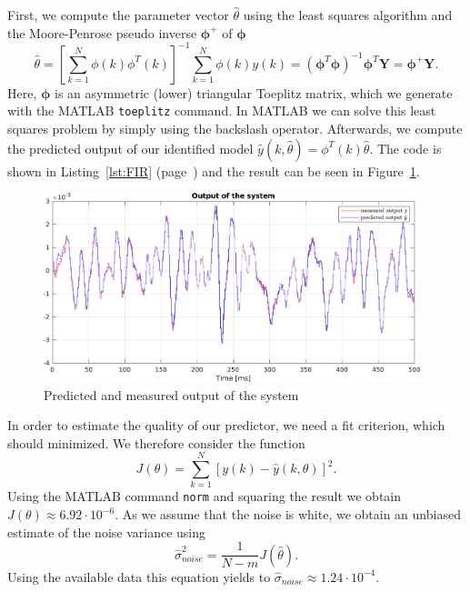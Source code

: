 First, we compute the parameter vector $\hat{\theta}$ using the least squares algorithm and the Moore-Penrose pseudo inverse $\pmb{\phi}^+$ of $\pmb{\phi}$
\begin{equation}\label{eq:FIRmodel}
	\hat{\theta} = \left[ \sum\limits_{k=1}^N \phi(k)\phi^T(k) \right]^{-1} \sum\limits_{k=1}^N 
\phi(k) y(k) = \left( \pmb{\phi}^T \pmb{\phi} \right)^{-1} \pmb{\phi}^T \textbf{Y} = \pmb{\phi}^+ \textbf{Y}.
\end{equation}
Here, $\pmb{\phi}$ is an asymmetric (lower) triangular Toeplitz matrix, which we generate with the MATLAB \texttt{toeplitz} command.
In MATLAB we can solve this least squares problem by simply using the backslash operator. 
Afterwards, we compute the predicted output of our identified model $\hat{y} (k,\hat{\theta}) = \phi^{T} (k) \hat{\theta}$. 
The code is shown in Listing~\ref{lst:FIR} (page~\pageref{lst:FIR}) and the result can be seen in Figure~\ref{fig:output_fir}.
\begin{figure}[h]
	\centering
	\includegraphics[height=5.5cm]{figures/output.pdf}
	\caption{Predicted and measured output of the system}\label{fig:output_fir}
\end{figure}
In order to estimate the quality of our predictor, we need a fit criterion, which should minimized. We therefore consider the function
\begin{equation}\label{eq:J}
	J(\theta) = \sum\limits_{k=1}^N \left[y(k) - \hat{y}(k,\theta) \right]^2.
\end{equation}
Using the MATLAB command \texttt{norm} and squaring the result we obtain $ J(\theta) \approx 6.92 \cdot 10^{-6}$. 
As we assume that the noise is white, we obtain an unbiased estimate of the noise variance using
\begin{equation}\label{eq:sigma}
	\hat{\sigma}_{noise}^{2} = \frac{1}{N-m} J(\hat{\theta}) .
\end{equation}
Using the available data this equation yields to $ \hat{\sigma}_{noise} \approx 1.24 \cdot 10^{-4} $.

